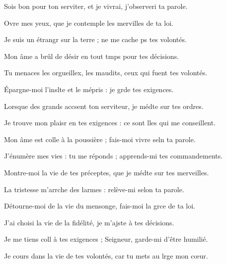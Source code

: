 \item Sois bon pour ton serviter, et je vivrai,\psstar{} j’observeri ta parole.
\item Ovre mes yeux,\psstar{} que je contemple les mervilles de ta loi.
\item Je suis un étrangr sur la terre ;\psstar{} ne me cache ps tes volontés.
\item Mon âme a brûl de désir\psstar{} en tout tmps pour tes décisions.
\item Tu menaces les orgueillex, les maudits,\psstar{} ceux qui fuent tes volontés.
\item Épargne-moi l’inslte et le mépris :\psstar{} je grde tes exigences.
\item Lorsque des grands accsent ton serviteur,\psstar{} je médte sur tes ordres.
\item Je trouve mon plaisr en tes exigences :\psstar{} ce sont lles qui me conseillent.
\item Mon âme est colle à la poussière ;\psstar{} fais-moi vivre seln ta parole.
\item J’énumère mes vies : tu me réponds ;\psstar{} apprends-mi tes commandements.
\item Montre-moi la vie de tes préceptes,\psstar{} que je médte sur tes merveilles.
\item La tristesse m’arrche des larmes :\psstar{} relève-mi selon ta parole.
\item Détourne-moi de la vie du mensonge,\psstar{} fais-moi la grce de ta loi.
\item J’ai choisi la vie de la fidélité,\psstar{} je m’ajste à tes décisions.
\item Je me tiens coll à tes exigences ;\psstar{} Seigneur, garde-mi d’être humilié.
\item Je cours dans la vie de tes volontés,\psstar{} car tu mets au lrge mon cœur.